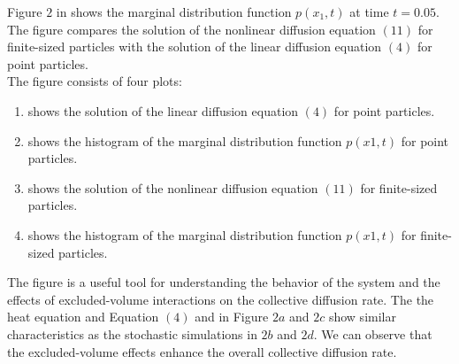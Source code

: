 Figure $2$ in \cite{Bruna2012} shows the marginal distribution function $p(x_1, t)$ at time $t = 0.05$. 
The figure compares the solution of the nonlinear diffusion equation $(11)$ for finite-sized particles with the solution of the linear diffusion equation $(4)$ for point particles. \\
The figure consists of four plots:
\begin{enumerate}[label=(\alph*)]
    \item shows the solution of the linear diffusion equation $(4)$ for point particles.
    \item shows the histogram of the marginal distribution function $p(x1, t)$ for point particles.
    \item shows the solution of the nonlinear diffusion equation $(11)$ for finite-sized particles.
    \item shows the histogram of the marginal distribution function $p(x1, t)$ for finite-sized particles.
\end{enumerate}
The figure is a useful tool for understanding the behavior of the system and the effects of excluded-volume interactions on the collective diffusion rate.
The the heat equation and Equation $(4)$ and in Figure $2a$ and $2c$ show similar characteristics as the stochastic simulations in $2b$ and $2d$. 
We can observe that the excluded-volume effects enhance the overall collective diffusion rate.










